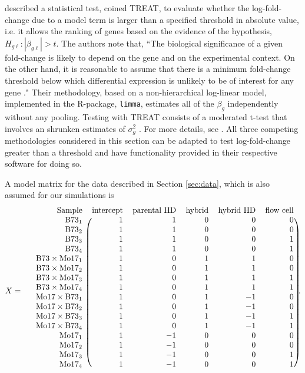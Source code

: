 \citet{treat} described a statistical test, coined TREAT, to evaluate whether the log-fold-change due to a model term is larger than a specified threshold in absolute value, i.e. it allows the ranking of genes based on the evidence of the hypothesis, $H_{g\ell}:|\beta_{g\ell}|>t$. The authors note that, ``The biological significance of a given fold-change is likely to depend on the gene and on the experimental context. On the other hand, it is reasonable to assume that there is a minimum fold-change threshold below which differential expression is unlikely to be of interest for any gene \citep[pp. 765-755]{treat}." Their methodology, based on a non-hierarchical log-linear model, implemented in the R-package, \texttt{limma}, estimates all of the $\beta_g$ independently without any pooling. Testing with TREAT consists of a moderated t-test that involves an shrunken estimates of $\sigma^2_g$ \citep{treat}. For more details, see \citet{treat}. All three competing methodologies considered in this section can be adapted to test log-fold-change greater than a threshold and have functionality provided in their respective software for doing so.

A model matrix for the \citet{paschold} data described in Section \ref{sec:data}, which is also assumed for our simulations is
{\footnotesize
\begin{equation*}
X =\quad \begin{blockarray}{rrrrrr}
  \mbox{Sample} & \mbox{intercept} & \mbox{parental HD} & \mbox{hybrid} & \mbox{hybrid HD} & \mbox{flow cell}\\
  \begin{block}{r(rrrrr)}
  \mbox{B73}_1  & 1 &  1 & 0 & 0 & 0\\
  \mbox{B73}_2  & 1 &  1 & 0 & 0 & 0\\
  \mbox{B73}_3  & 1 &  1 & 0 & 0 & 1\\
  \mbox{B73}_4  & 1 &  1 & 0 & 0 & 1\\
  \mbox{B73}\times\mbox{Mo17}_1  & 1 &  0 & 1 & 1 & 0\\
  \mbox{B73}\times\mbox{Mo17}_2  & 1 &  0 & 1 & 1 & 0\\
  \mbox{B73}\times\mbox{Mo17}_3  & 1 &  0 & 1 & 1 & 1\\
  \mbox{B73}\times\mbox{Mo17}_4  & 1 &  0 & 1 & 1 & 1\\
  \mbox{Mo17}\times\mbox{B73}_1  & 1 &  0 & 1 & -1 & 0\\
  \mbox{Mo17}\times\mbox{B73}_2  & 1 &  0 & 1 & -1 & 0\\
  \mbox{Mo17}\times\mbox{B73}_3  & 1 &  0 & 1 & -1 & 1\\
  \mbox{Mo17}\times\mbox{B73}_4  & 1 &  0 & 1 & -1 & 1\\
  \mbox{Mo17}_1 & 1 & -1 & 0 & 0 & 0\\
  \mbox{Mo17}_2 & 1 & -1 & 0 & 0 & 0\\
  \mbox{Mo17}_3 & 1 & -1 & 0 & 0 & 1\\
  \mbox{Mo17}_4 & 1 & -1 & 0 & 0 & 1\\
  \end{block}
\end{blockarray}.
\label{design}
\end{equation*}
}

